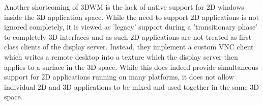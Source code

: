 Another shortcoming of 3DWM is the lack of native support for 2D windows inside the 3D application space. While the need to support 2D applications is not ignored completely, it is viewed as 'legacy' support during a 'transitionary phase' to completely 3D interfaces and as such 2D applications are not treated as first class clients of the display server. Instead, they implement a custom VNC client which writes a remote desktop into a texture which the display server then applies to a surface in the 3D space. While this does indeed provide simultaneous support for 2D applications running on many platforms, it does not allow individual 2D and 3D applications to be mixed and used together in the same 3D space. 
